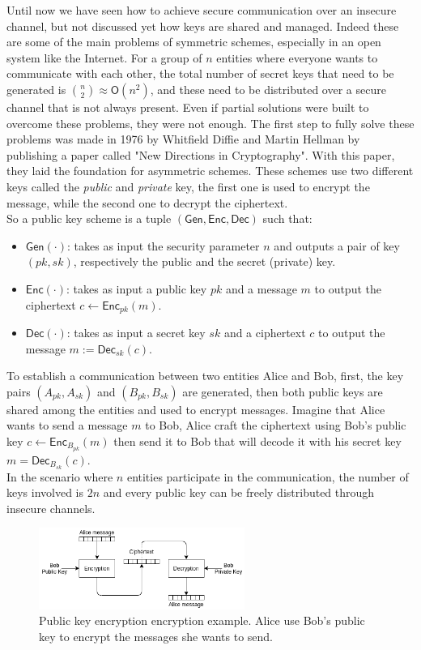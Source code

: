 Until now we have seen how to achieve secure communication  over an insecure channel, but not discussed yet how keys are shared and managed. Indeed these are some of the main problems of symmetric schemes, especially in an open system like the Internet. For a group of $n$ entities where everyone wants to communicate with each other, the total number of secret keys that need to be generated is $\binom{n}{2} \approx \mathsf{O}(n^2)$, and these need to be distributed over a secure channel that is not always present.
Even if partial solutions were built to overcome these problems, they were not enough.
The first step to fully solve these problems was made in 1976 by Whitfield Diffie and Martin Hellman by publishing a paper called "New Directions in Cryptography". With this paper, they laid the foundation for asymmetric schemes. These schemes use two different keys called the \emph{public} and \emph{private} key, the first one is used to encrypt the message, while the second one to decrypt the ciphertext.\\
So a public key scheme is a tuple $(\mathsf{Gen}, \mathsf{Enc}, \mathsf{Dec})$ such that:
\begin{itemize}
    \item{$\mathsf{Gen}(\cdot)$: takes as input the security parameter $n$ and outputs a pair of key $(pk, sk)$, respectively the public and the secret (private) key.}
    \item{$\mathsf{Enc}(\cdot)$: takes as input a public key $pk$ and a message $m$ to output the ciphertext $c \leftarrow \mathsf{Enc}_{pk}(m)$.}
    \item{$\mathsf{Dec}(\cdot)$: takes as input a secret key $sk$ and a ciphertext $c$ to output the message $m := \mathsf{Dec}_{sk}(c)$.}
\end{itemize}
To establish a communication between two entities Alice and Bob, first, the key pairs $(A_{pk}, A_{sk})$ and $(B_{pk}, B_{sk})$ are generated, then both public keys are shared among the entities and used to encrypt messages. Imagine that Alice wants to send a message $m$ to Bob, Alice craft the ciphertext using Bob's public key $c \leftarrow  \mathsf{Enc}_{B_{pk}}(m)$ then send it to Bob that will decode it with his secret key\\$m = \mathsf{Dec}_{B_{sk}}(c)$.\\
In the scenario where $n$ entities participate in the communication, the number of keys involved is $2n$ and every public key can be freely distributed through insecure channels.
\begin{figure}[H]
    \centering
    \includegraphics[width=0.6\textwidth]{img/public-key/encryption.png}
    \caption[Public key encryption encryption example.]{Public key encryption encryption example. Alice use Bob's public key to encrypt the messages she wants to send.}
\end{figure}
